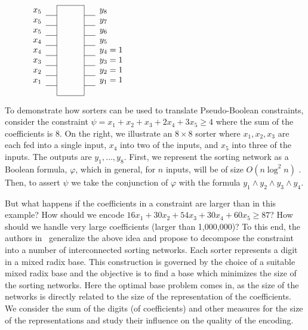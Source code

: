 \documentclass[envcountsame]{llncs}
\begin{document}
\begin{wrapfigure}{r}{42mm}\vspace{-10mm}
  \begin{center}\scriptsize  
     $\begin{array}{ll|l|ll}
      \cline{3-3}
      x_5    & ~ &\hspace{8mm} & ~& y_8\\
        \cline{2-2} \cline{4-4}
      x_5 & ~ & & & y_7\\
        \cline{2-2} \cline{4-4}
      x_5 & ~ & & & y_6\\
        \cline{2-2} \cline{4-4}
      x_4 & ~ & & & y_5\\
        \cline{2-2} \cline{4-4}
      x_4 & ~ & & & y_4=1\\
        \cline{2-2} \cline{4-4}
      x_3 & ~ & & & y_3=1\\
        \cline{2-2} \cline{4-4}
      x_2 & ~ & & & y_2=1\\
        \cline{2-2} \cline{4-4}
      x_1 & ~ & & & y_1=1\\
        \cline{2-2} \cline{4-4}
          & & &\\
      \cline{3-3}
    \end{array}$
  \end{center}
\vspace{-11mm}
\end{wrapfigure}
To demonstrate how sorters can be used to translate Pseudo-Boolean
constraints, consider the constraint $\psi=x_1 + x_2 + x_3 + 2x_4 +
3x_5 \geq 4$ where the sum of the coefficients is 8. On the right, we
illustrate an $8\times 8$ sorter where $x_1,x_2,x_3$ are each fed into
a single input, $x_4$ into two of the inputs, and $x_5$ into three of
the inputs. The outputs are $y_1,\ldots,y_8$.  First, we represent the
sorting network as a Boolean formula, $\varphi$, which in general, for
$n$ inputs, will be of size $O(n\log^2 n)$ \cite{Batcher68}. Then, to
assert $\psi$ we take the conjunction of $\varphi$ with the formula
$y_1\land y_2\land y_3\land y_4$.

But what happens if the coefficients in a constraint are larger than
in this example?  How should we encode 
$16 x_1 + 30 x_2 + 54 x_3 + 30 x_4 + 60 x_5 \geq 87$?  How should we
handle very large coefficients (larger than 1,000,000)? To this end,
the authors in~\cite{EenS06} generalize the above idea and propose 
to decompose the constraint into a number of interconnected
sorting networks. Each sorter represents a digit in a mixed radix
base.
This construction is governed by the choice of a suitable mixed radix
base and the objective is to find a base which minimizes the size of
the sorting networks. 
Here the optimal base problem comes in, as the size of the
networks is directly related to the size of the representation of the
coefficients. We consider the sum of the digits (of coefficients)
and other measures for the size of the representations
and study their influence on the quality of the encoding.
\end{document}
